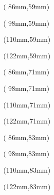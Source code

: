 \documentclass[aspectratio=169]{beamer}
\begin{document}
\begin{frame}
    \begin{textblock*}{15mm}( 86mm,59mm)
    \end{textblock*}
    \begin{textblock*}{15mm}( 98mm,59mm)
    \end{textblock*}
    \begin{textblock*}{15mm}(110mm,59mm)
    \end{textblock*}
    \begin{textblock*}{15mm}(122mm,59mm)
    \end{textblock*}

    \begin{textblock*}{15mm}( 86mm,71mm)
    \end{textblock*}
    \begin{textblock*}{15mm}( 98mm,71mm)
    \end{textblock*}
    \begin{textblock*}{15mm}(110mm,71mm)
    \end{textblock*}
    \begin{textblock*}{15mm}(122mm,71mm)
    \end{textblock*}

    \begin{textblock*}{15mm}( 86mm,83mm)
    \end{textblock*}
    \begin{textblock*}{15mm}( 98mm,83mm)
    \end{textblock*}
    \begin{textblock*}{15mm}(110mm,83mm)
    \end{textblock*}
    \begin{textblock*}{15mm}(122mm,83mm)
    \end{textblock*}
\end{frame}
\end{document}
